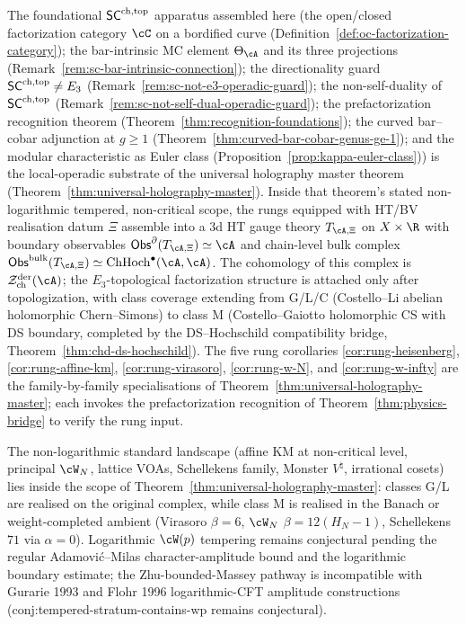 \begin{remark}
\label{rem:foundations-universal-holography-anchor}%
%
%
The foundational $\mathsf{SC}^{\mathrm{ch},\mathrm{top}}$ apparatus assembled here (the open/closed
factorization category $\cC$ on a bordified curve
(Definition~\ref{def:oc-factorization-category}); the bar-intrinsic
MC element $\Theta_\cA$ and its three projections
(Remark~\ref{rem:sc-bar-intrinsic-connection}); the directionality
guard $\mathsf{SC}^{\mathrm{ch},\mathrm{top}} \neq E_3$
(Remark~\ref{rem:sc-not-e3-operadic-guard}); the non-self-duality
of $\mathsf{SC}^{\mathrm{ch},\mathrm{top}}$
(Remark~\ref{rem:sc-not-self-dual-operadic-guard}); the prefactorization
recognition theorem
(Theorem~\ref{thm:recognition-foundations}); the curved bar--cobar
adjunction at $g \geq 1$
(Theorem~\ref{thm:curved-bar-cobar-genus-ge-1}); and the
modular characteristic as Euler class
(Proposition~\ref{prop:kappa-euler-class})) is the local-operadic
substrate of the universal holography master theorem
(Theorem~\ref{thm:universal-holography-master}).
Inside that theorem's stated non-logarithmic tempered, non-critical
scope, the rungs equipped with HT/BV realisation datum $\Xi$ assemble
into a $3$d HT gauge theory
$T_{\cA,\Xi}$ on $X \times \R$ with boundary observables
$\Obs^{\partial}(T_{\cA,\Xi}) \simeq \cA$ and chain-level bulk complex
$\Obs^{\mathrm{bulk}}(T_{\cA,\Xi}) \simeq
\ChirHoch^\bullet(\cA,\cA)$. The cohomology of this complex is
$\cZ^{\mathrm{der}}_{\mathrm{ch}}(\cA)$; the $E_3$-topological
factorization structure is attached only after topologization, with
class coverage extending from G/L/C (Costello--Li abelian
holomorphic Chern--Simons) to class M (Costello--Gaiotto holomorphic
CS with DS boundary, completed by the DS--Hochschild
compatibility bridge, Theorem~\ref{thm:chd-ds-hochschild}). The five
rung corollaries
\ref{cor:rung-heisenberg}, \ref{cor:rung-affine-km},
\ref{cor:rung-virasoro}, \ref{cor:rung-w-N}, and
\ref{cor:rung-w-infty} are the family-by-family
specialisations of Theorem~\ref{thm:universal-holography-master};
each invokes the prefactorization recognition of
Theorem~\ref{thm:physics-bridge} to verify the rung input.

The non-logarithmic standard landscape (affine KM at non-critical
level, principal $\cW_N$, lattice VOAs, Schellekens family,
Monster $V^\natural$, irrational cosets) lies inside the scope of
Theorem~\ref{thm:universal-holography-master}: classes G/L are realised on the
original complex, while class M is realised in the Banach or
weight-completed ambient (Virasoro $\beta = 6$, $\cW_N$
$\beta = 12(H_N - 1)$, Schellekens $71$ via $\alpha = 0$).
Logarithmic $\cW(p)$ tempering remains conjectural pending the
regular Adam\-ovi\'{c}--Milas character-amplitude bound and the
logarithmic boundary estimate; the
Zhu-bounded-Massey pathway is incompatible with Gurarie 1993 and
Flohr 1996 logarithmic-CFT amplitude constructions
(\textsf{conj:tempered-stratum-contains-wp} remains conjectural).
\end{remark}

